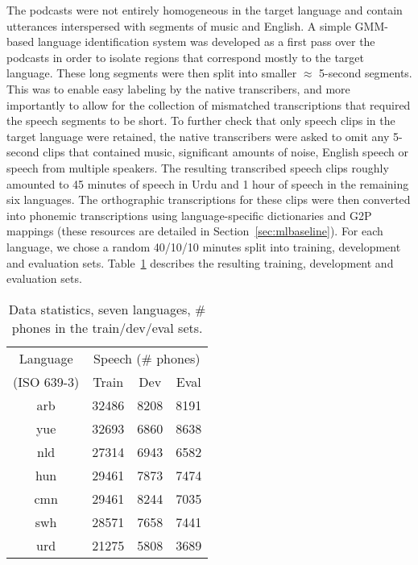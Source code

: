The podcasts were not entirely homogeneous in the target
language and contain utterances interspersed with segments of music
and English. A simple GMM-based language identification system was
developed as a first pass over the podcasts in order to isolate
regions that correspond mostly to the target language. These long
segments were then split into smaller $\approx$ 5-second
segments. This was to enable easy labeling by the native transcribers,
and more importantly to allow for the collection of mismatched
transcriptions that required the speech segments to be short. To
further check that only speech clips in the target language were
retained, the native transcribers were asked to omit any 5-second
clips that contained music, significant amounts of noise, English
speech or speech from multiple speakers. The resulting transcribed
speech clips roughly amounted to 45 minutes of speech in Urdu and 1
hour of speech in the remaining six languages. The orthographic
transcriptions for these clips were then converted into phonemic
transcriptions using language-specific dictionaries and G2P mappings
(these resources are detailed in Section~\ref{sec:mlbaseline}). For
each language, we chose a random 40/10/10 minutes split into training,
development and evaluation sets.  Table~\ref{tab:data} describes the
resulting training, development and evaluation sets.
\begin{table}[t]
\centering
\begin{tabular}{|c||ccc|}\hline
Language  & \multicolumn{3}{c|}{Speech (\# phones)}\\
(ISO 639-3) & Train & Dev & Eval \\ \hline\hline
arb & 32486 & 8208 & 8191 \\
yue & 32693 & 6860 & 8638 \\
nld & 27314 & 6943 & 6582 \\
hun & 29461 & 7873 & 7474 \\
cmn & 29461 & 8244 & 7035 \\
swh & 28571 & 7658 & 7441 \\
urd & 21275 & 5808 & 3689 \\\hline
\end{tabular}
\vspace*{1mm}
\caption{Data statistics, seven languages, \# 
phones in the train/dev/eval sets.}
\label{tab:data}
\end{table}
